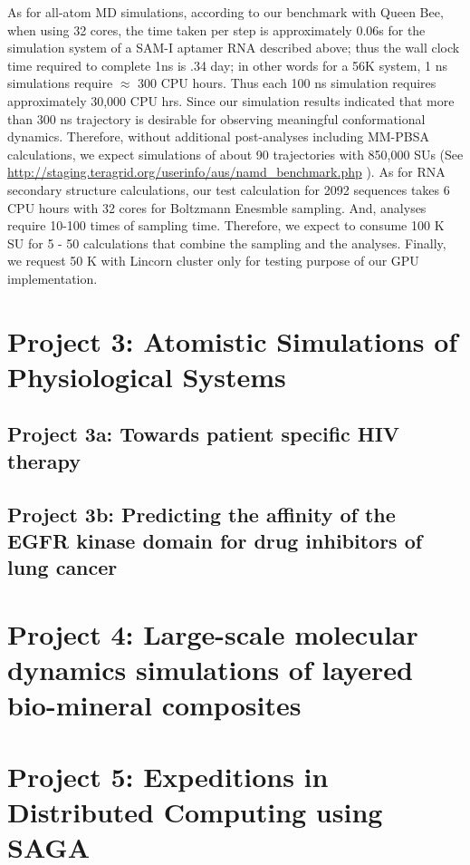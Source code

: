 \documentclass[a4paper,10pt]{article}
\begin{document}
As for all-atom MD simulations, according to our benchmark with Queen Bee, when using 32 cores, the time taken per step is approximately 0.06s for the simulation system of a SAM-I aptamer RNA described above; thus the wall clock time required to complete 1ns is .34 day; in other words for a 56K system, 1 ns simulations require $\approx$ 300 CPU hours.  Thus each 100 ns simulation requires approximately 30,000 CPU hrs.  Since our simulation results indicated that more than 300 ns trajectory is desirable for observing meaningful conformational dynamics. Therefore, without additional post-analyses including MM-PBSA calculations, we expect simulations of about 90 trajectories with 850,000 SUs (See {\url{http://staging.teragrid.org/userinfo/aus/namd_benchmark.php}} ).  As for RNA secondary structure calculations, our test calculation for 2092 sequences takes 6 CPU hours with 32 cores for Boltzmann Enesmble sampling.  And, analyses require 10-100 times of sampling time.  Therefore, we expect to consume 100 K SU for 5 - 50 calculations that combine the sampling and the analyses.  Finally, we request 50 K with Lincorn cluster only for testing purpose of our GPU implementation.  




\section*{Project 3: Atomistic Simulations of Physiological Systems}

\subsection*{Project 3a: Towards patient specific HIV therapy}


\subsection*{Project 3b: Predicting the affinity of the EGFR kinase domain for drug inhibitors of lung cancer}



\section*{Project 4: Large-scale molecular dynamics simulations of layered bio-mineral composites}
 


\section*{Project 5: Expeditions in Distributed Computing using SAGA}
\end{document}
